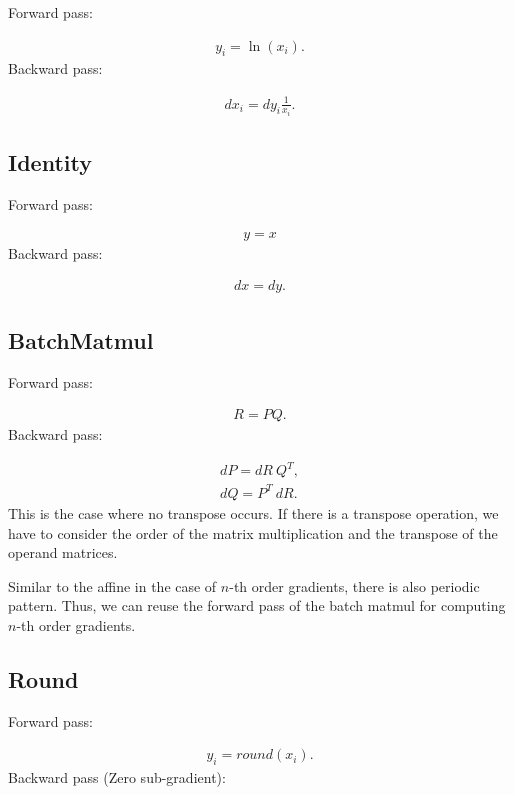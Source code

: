 \documentclass{article}
\begin{document}
Forward pass:

\begin{eqnarray}
  y_i = \ln(x_i).    
\end{eqnarray}
%
Backward pass:

\begin{eqnarray}
  dx_i = dy_i \frac{1}{x_i}.
\end{eqnarray}


\subsection{Identity}

Forward pass:

\begin{eqnarray}
  y = x
\end{eqnarray}
%
Backward pass:

\begin{eqnarray}
  dx = dy.
\end{eqnarray}


\subsection{BatchMatmul}

Forward pass:

\begin{eqnarray}
  R = P Q.
\end{eqnarray}
%
Backward pass:

\begin{eqnarray}
  dP = dR \ Q^T, \\
  dQ = P^T \ dR.
\end{eqnarray}
%
This is the case where no transpose occurs. If there is a transpose operation, we have to consider the order of the matrix multiplication and the transpose of the operand matrices.

Similar to the affine in the case of $n$-th order gradients, there is also periodic pattern. Thus, we can reuse the forward pass of the batch matmul for computing $n$-th order gradients.

\subsection{Round}

Forward pass:

\begin{eqnarray}
  y_i = round(x_i).    
\end{eqnarray}
%
Backward pass (Zero sub-gradient):
\end{document}
